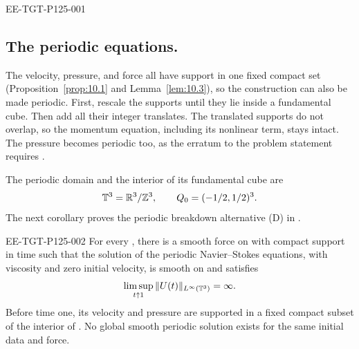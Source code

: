 %
\begin{EESegment}{EE-TGT-P125-001}
\subsection{The periodic equations.}\label{sec:10.5}
The velocity, pressure, and force all have support in one fixed compact set
(Proposition~\ref{prop:10.1} and Lemma~\ref{lem:10.3}), so the construction can also be
made periodic. First, rescale the supports until they lie inside a fundamental cube. Then
add all their integer translates. The translated supports do not overlap, so the momentum
equation, including its nonlinear term, stays intact. The pressure becomes periodic too, as
the erratum to the problem statement requires \cite{ref-13}.

The periodic domain and the interior of its fundamental cube are
\[
  \mathbb{T}^3=\mathbb{R}^3/\mathbb{Z}^3,\qquad Q_0=(-1/2,1/2)^3.
\]
The next corollary proves the periodic breakdown alternative (D) in \cite{ref-13}.
\end{EESegment}

\begin{corollary}\label{cor:10.6}
\begin{EESegment}{EE-TGT-P125-002}
For every , there is a smooth force on
\NSi{NS-F-P125-003}{\T^3\times[0,\infty)} with compact support in time such that the
solution  of the periodic Navier--Stokes
equations, with viscosity  and zero initial velocity, is smooth
on \NSi{NS-F-P125-006}{[0,1)} and satisfies
\[
  \limsup_{t\uparrow1}\|U(t)\|_{L^\infty(\mathbb{T}^3)}=\infty.
\]
Before time one, its velocity and pressure are supported in a fixed compact subset of the
interior of . No global smooth periodic solution exists for the
same initial data and force.
\end{EESegment}
\end{corollary}


